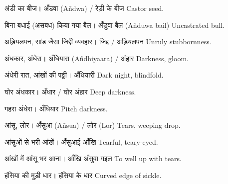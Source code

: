 %
{अंडी का बीज।}%
{अँडवा (Añdwa) / रेड़ी के बीज}%
{Castor seed.}

%
{बिना बधाई (असबध) किया गया बैल।}%
{अँडुवा बैल (Añduwa bail)}%
{Uncastrated bull.}

%
{अड़ियलपन, सांड जैसा जिद्दी व्यवहार।}%
{जिद्द / अड़ियलपन}%
{Unruly stubbornness.}

%
{अंधकार, अंधेरा।}%
{अँधियारा (Añdhiyaara) / अंहार}%
{Darkness, gloom.}

%
{अंधेरी रात, आंखों की पट्टी।}%
{अँधियारी}%
{Dark night, blindfold.}

%
{घोर अंधकार।}%
{अँधार / घोर अंहार}%
{Deep darkness.}

%
{गहरा अंधेरा।}%
{अँधियार}%
{Pitch darkness.}

%
{आंसू, लोर।}%
{अँसुआ (Añsua) / लोर (Lor)}%
{Tears, weeping drop.}

%
{आंसुओं से भरी आंखें।}%
{अँसुआई आँखि}%
{Tearful, teary-eyed.}

%
{आंखों में आंसू भर आना।}%
{आँखि अँसुवा गइल}%
{To well up with tears.}

%
{हंसिया की मुड़ी धार।}%
{हंसिया के धार}%
{Curved edge of sickle.}
